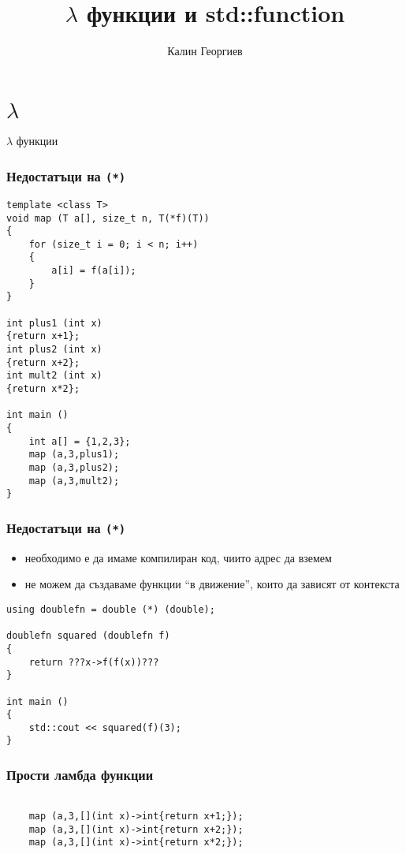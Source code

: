 \documentclass{beamer}
\begin{document}
\title[Обектно ориентирано програмиране]{$\lambda$ функции и std::function}
\author{Калин Георгиев}
\frame{\titlepage}

\section{$\lambda$}


\begin{frame}
    \centerline{$\lambda$ функции}
\end{frame}

\begin{frame}[fragile]
    \frametitle{Недостатъци на \texttt{(*)}}
    
\begin{lstlisting}[basicstyle=\tiny]
template <class T>
void map (T a[], size_t n, T(*f)(T))
{ 
    for (size_t i = 0; i < n; i++)
    {
        a[i] = f(a[i]);
    }
}

int plus1 (int x)
{return x+1};
int plus2 (int x)
{return x+2};
int mult2 (int x)
{return x*2};

int main ()
{
    int a[] = {1,2,3};
    map (a,3,plus1);
    map (a,3,plus2);
    map (a,3,mult2);
}
\end{lstlisting}
\end{frame}



\begin{frame}[fragile]
    \frametitle{Недостатъци на \texttt{(*)}}
    
    \begin{itemize}
        \item необходимо е да имаме компилиран код, чиито адрес да вземем
        \item не можем да създаваме функции ``в движение'', които да зависят от контекста
    \end{itemize}
    
\begin{lstlisting}[basicstyle=\tiny]
using doublefn = double (*) (double);

doublefn squared (doublefn f)
{ 
    return ???x->f(f(x))???
}

int main ()
{
    std::cout << squared(f)(3);
}
\end{lstlisting}
\end{frame}
    


\begin{frame}[fragile]
    \frametitle{Прости ламбда функции}
    
\begin{lstlisting}[]

    map (a,3,[](int x)->int{return x+1;});
    map (a,3,[](int x)->int{return x+2;});
    map (a,3,[](int x)->int{return x*2;});

\end{lstlisting}
\end{frame}
\end{document}
